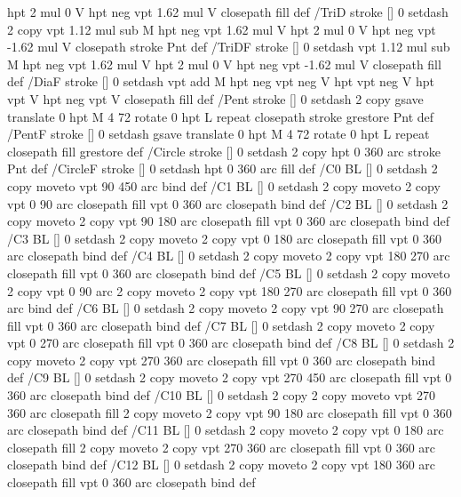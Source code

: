 {{  hpt 2 mul 0 V
  hpt neg vpt 1.62 mul V closepath fill } def
/TriD { stroke [] 0 setdash 2 copy vpt 1.12 mul sub M
  hpt neg vpt 1.62 mul V
  hpt 2 mul 0 V
  hpt neg vpt -1.62 mul V closepath stroke
  Pnt  } def
/TriDF { stroke [] 0 setdash vpt 1.12 mul sub M
  hpt neg vpt 1.62 mul V
  hpt 2 mul 0 V
  hpt neg vpt -1.62 mul V closepath fill} def
/DiaF { stroke [] 0 setdash vpt add M
  hpt neg vpt neg V hpt vpt neg V
  hpt vpt V hpt neg vpt V closepath fill } def
/Pent { stroke [] 0 setdash 2 copy gsave
  translate 0 hpt M 4 {72 rotate 0 hpt L} repeat
  closepath stroke grestore Pnt } def
/PentF { stroke [] 0 setdash gsave
  translate 0 hpt M 4 {72 rotate 0 hpt L} repeat
  closepath fill grestore } def
/Circle { stroke [] 0 setdash 2 copy
  hpt 0 360 arc stroke Pnt } def
/CircleF { stroke [] 0 setdash hpt 0 360 arc fill } def
/C0 { BL [] 0 setdash 2 copy moveto vpt 90 450  arc } bind def
/C1 { BL [] 0 setdash 2 copy        moveto
       2 copy  vpt 0 90 arc closepath fill
               vpt 0 360 arc closepath } bind def
/C2 { BL [] 0 setdash 2 copy moveto
       2 copy  vpt 90 180 arc closepath fill
               vpt 0 360 arc closepath } bind def
/C3 { BL [] 0 setdash 2 copy moveto
       2 copy  vpt 0 180 arc closepath fill
               vpt 0 360 arc closepath } bind def
/C4 { BL [] 0 setdash 2 copy moveto
       2 copy  vpt 180 270 arc closepath fill
               vpt 0 360 arc closepath } bind def
/C5 { BL [] 0 setdash 2 copy moveto
       2 copy  vpt 0 90 arc
       2 copy moveto
       2 copy  vpt 180 270 arc closepath fill
               vpt 0 360 arc } bind def
/C6 { BL [] 0 setdash 2 copy moveto
      2 copy  vpt 90 270 arc closepath fill
              vpt 0 360 arc closepath } bind def
/C7 { BL [] 0 setdash 2 copy moveto
      2 copy  vpt 0 270 arc closepath fill
              vpt 0 360 arc closepath } bind def
/C8 { BL [] 0 setdash 2 copy moveto
      2 copy vpt 270 360 arc closepath fill
              vpt 0 360 arc closepath } bind def
/C9 { BL [] 0 setdash 2 copy moveto
      2 copy  vpt 270 450 arc closepath fill
              vpt 0 360 arc closepath } bind def
/C10 { BL [] 0 setdash 2 copy 2 copy moveto vpt 270 360 arc closepath fill
       2 copy moveto
       2 copy vpt 90 180 arc closepath fill
               vpt 0 360 arc closepath } bind def
/C11 { BL [] 0 setdash 2 copy moveto
       2 copy  vpt 0 180 arc closepath fill
       2 copy moveto
       2 copy  vpt 270 360 arc closepath fill
               vpt 0 360 arc closepath } bind def
/C12 { BL [] 0 setdash 2 copy moveto
       2 copy  vpt 180 360 arc closepath fill
               vpt 0 360 arc closepath } bind def
}
